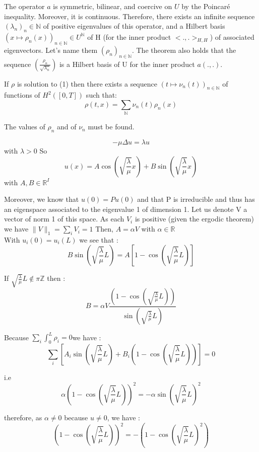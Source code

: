 \documentclass{article}
\begin{document}
The operator $a$ is symmetric, bilinear, and coercive on $U$ by the Poincaré inequality. Moreover, it is continuous. Therefore, there exists an infinite sequence $(\lambda_n)_n \in \mathbb{N}$ of positive eigenvalues of this operator, and a Hilbert basis $(x \mapsto \rho_n(x))_{n\in \mathbb{N}} \in U^\mathbb{N}$ of H (for the inner product $<.,.>_{H, H}$) of associated eigenvectors. Let's name them $(\rho_n)_{n \in \mathbb{N}}$. The theorem also holds that the sequence $(\frac{\rho_n}{\sqrt{\lambda_n}})$ is a Hilbert basis of U for the inner product $a(., .)$. 

If $\rho$ is solution to (1) then there exists a sequence $(t \mapsto \nu_n(t))_{n \in \mathbb{N}}$ of functions of $H^2([0, T])$ such that:
\[\rho(t, x) = \sum_\mathbb{N}\nu_n(t)\rho_n(x)\]

The values of $\rho_n$ and of $\nu_n$ must be found.

\[-\mu \Delta u = \lambda u \] with $\lambda > 0$
So \[u(x) = A \cos\left(\sqrt{\frac{\lambda}{\mu}}x\right) + B\sin\left(\sqrt{\frac{\lambda}{\mu}}x\right)\] with $A, B \in \mathbb{R}^{I} $

Moreover, we know that $u(0) = Pu(0)$
and that P is irreducible and thus has an eigenspace associated to the eigenvalue 1 of dimension 1. Let us denote V a vector of norm 1 of this space. As each $V_i$ is positive (given the ergodic theorem) we have $\| V \|_1 = \sum_i V_i = 1 $
Then, $A = \alpha V$ with $\alpha \in \mathbb{R}$\\

With $u_i(0) = u_i(L)$ we see that :
\[B\sin\left(\sqrt{\frac{\lambda}{\mu}}L\right) = A\left[1-\cos\left(\sqrt{\frac{\lambda}{\mu}}L\right)\right]\]

If $\sqrt{\frac{\lambda}{\mu}}L \notin \pi \mathbb{Z}$ then :  \[B = \alpha V\frac{\left(1-\cos\left(\sqrt{\frac{\lambda}{\mu}}L\right)\right)}{\sin\left(\sqrt{\frac{\lambda}{\mu}}L\right)}\]

Because $\sum_i\int_0^L\rho_i = 0 $we have :
\[ \sum_i\left[A_i\sin\left(\sqrt{\frac{\lambda}{\mu}}L\right) + B_i\left(1- \cos\left(\sqrt{\frac{\lambda}{\mu}}L\right)\right)\right] = 0\]

i.e \[\alpha\left(1-\cos\left(\sqrt{\frac{\lambda}{\mu}}L\right)\right)^{2} = -\alpha\sin\left(\sqrt{\frac{\lambda}{\mu}}L\right)^{2}\]

therefore, as $\alpha \neq 0$ because $u \neq 0$, we have : \[\left(1-\cos\left(\sqrt{\frac{\lambda}{\mu}}L\right)\right)^{2} = - \left(1-\cos\left(\sqrt{\frac{\lambda}{\mu}}L\right)^{2}\right)\]
\end{document}
